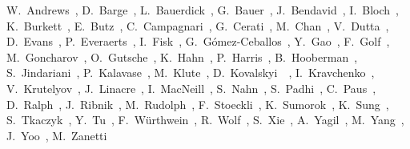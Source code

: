 \begin{Authlist}
%
W.~Andrews~, 
D.~Barge~, 
L.~Bauerdick~, 
G.~Bauer~,
J.~Bendavid~,
I.~Bloch~, 
K.~Burkett~, 
E.~Butz~,
C.~Campagnari~, 
G.~Cerati~,
M.~Chan~,
V.~Dutta~,
D.~Evans~, 
P.~Everaerts~,
I.~Fisk~, 
G.~G\'omez-Ceballos~,
Y.~Gao~, 
F.~Golf~, 
M.~Goncharov~,
O.~Gutsche~, 
K.~Hahn~,
P.~Harris~,
B.~Hooberman~,
S.~Jindariani~,
P.~Kalavase~, 
M.~Klute~,
D.~Kovalskyi~~, 
I.~Kravchenko~,
V.~Krutelyov~, 
J.~Linacre~,
I.~MacNeill~,
S.~Nahn~,
S.~Padhi~, 
C.~Paus~,
D.~Ralph~,
J.~Ribnik~,
M.~Rudolph~,
F.~Stoeckli~,
K.~Sumorok~,
K.~Sung~,
S.~Tkaczyk~,
Y.~Tu~, 
F.~W\"urthwein~, 
R.~Wolf~,
S.~Xie~,
A.~Yagil~, 
M.~Yang~,
J.~Yoo~,
M.~Zanetti~
%
\end{Authlist}

